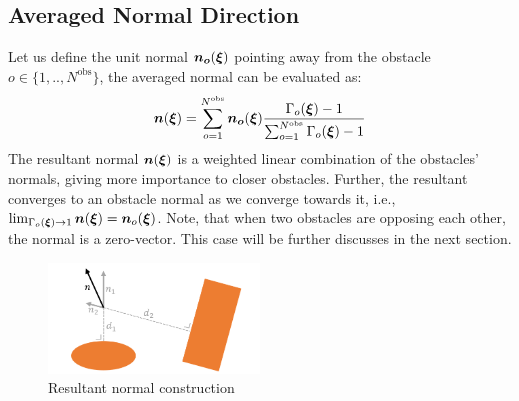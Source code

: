 \documentclass[conference]{IEEEtran}
\begin{document}
\subsection{Averaged Normal Direction} \label{sec:obstacle_normals}
Let us define the unit normal $\boldsymbol{n_o} (\boldsymbol{\xi})$  pointing away from the obstacle $o \in \{1,  ..,  N^{\mathrm{obs}} \}$, the averaged normal can be evaluated as:
\begin{equation}
  \boldsymbol{n}(\boldsymbol{\xi}) = \sum_{o=1}^{N^{\mathrm{obs}}} \boldsymbol{n_o}(\boldsymbol{\xi})
  \frac{\Gamma_o(\boldsymbol{\xi}) - 1}{\sum_{o=1}^{N^\mathrm{obs}} \Gamma_o(\boldsymbol{\xi}) - 1}
\end{equation}
The resultant normal $\boldsymbol{n}(\boldsymbol{\xi})$ is a weighted linear combination of the obstacles' normals, giving more importance to closer obstacles.
Further, the resultant converges to an obstacle normal as we converge towards it, i.e., $\lim_{\Gamma_o(\boldsymbol{\xi}) \rightarrow 1} \boldsymbol{n}(\boldsymbol{\xi}) = \boldsymbol{n}_o(\boldsymbol{\xi})$.
Note, that when two obstacles are opposing each other, the normal is a zero-vector. This case will be further discusses in the next section.

\begin{figure}
\centerline{\includegraphics[width=0.5\textwidth]{figures/resultant_normal.png}}
\caption{Resultant normal construction}
\label{resultant_normal}
\end{figure}

\end{document}
